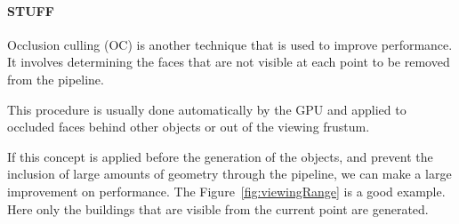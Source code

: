\paragraph{STUFF} %
\label{par:stuff}

Occlusion culling (OC) is another technique that is used to improve performance. It involves determining the faces that are not visible at each point to be removed from the pipeline.

This procedure is usually done automatically by the GPU and applied to occluded faces behind other objects or out of the viewing frustum.

If this concept is applied before the generation of the objects, and prevent the inclusion of large amounts of geometry through the pipeline, we can make a large improvement on performance. The Figure~\ref{fig:viewingRange} is a good example. Here only the buildings that are visible from the current point are generated.



